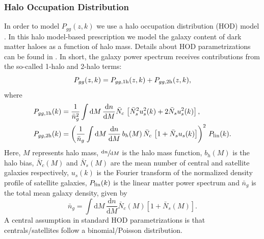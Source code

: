\documentclass[a4paper,11pt]{article}
\begin{document}
  \subsubsection{Halo Occupation Distribution}\label{sssec:methods.theory.hod}
    In order to model $P_{gg}(z,k)$ we use a halo occupation distribution (HOD) model \citep{2000MNRAS.318.1144P,2002PhR...372....1C,2002ApJ...575..587B,2005ApJ...633..791Z,2013MNRAS.430..725V}. In this halo model-based prescription we model the galaxy content of dark matter haloes as a function of halo mass. Details about HOD parametrizations can be found in \cite{2011ApJ...736...59Z}. In short, the galaxy power spectrum receives contributions from the so-called 1-halo and 2-halo terms:
    \begin{equation}
      P_{gg}(z,k) = P_{gg,{\rm 1h}}(z,k) + P_{gg,{\rm 2h}}(z,k),
    \end{equation}
    where
    \begin{align}
      & P_{gg,{\rm 1h}}(k)=\frac{1}{\bar{n}_g^2} \int \mathrm{d}M\,\frac{\mathrm{d}n}{\mathrm{d}M} \bar{N}_c\,\left[\bar{N}_s^2u_s^2(k)+2\bar{N}_su_s^2(k)\right],\\
      & P_{gg,{\rm 2h}}(k)=\left(\frac{1}{\bar{n}_g} \int \mathrm{d}M\,\frac{\mathrm{d}n}{\mathrm{d}M}\,b_h(M)\,\bar{N}_c\,\left[1+\bar{N}_su_s(k)\right]\right)^2\,P_{\rm lin}(k).
    \end{align}
    Here, $M$ represents halo mass, $\sfrac{\mathrm{d}n}{\mathrm{d}M}$ is the halo mass function, $b_h(M)$ is the halo bias, $\bar{N}_c(M)$ and $\bar{N}_s(M)$ are the mean number of central and satellite galaxies respectively, $u_s(k)$ is the Fourier transform of the normalized density profile of satellite galaxies, $P_{\rm lin}(k)$ is the linear matter power spectrum and $\bar{n}_g$ is the total mean galaxy density, given by
    \begin{equation}
      \bar{n}_g=\int \mathrm{d}M\,\frac{\mathrm{d}n}{\mathrm{d}M}\bar{N}_c(M)\left[1+\bar{N}_s(M)\right].
      \label{eq:ng_hod}
    \end{equation}
    A central assumption in standard HOD parametrizations is that centrals/satellites follow a binomial/Poisson distribution.
\end{document}
